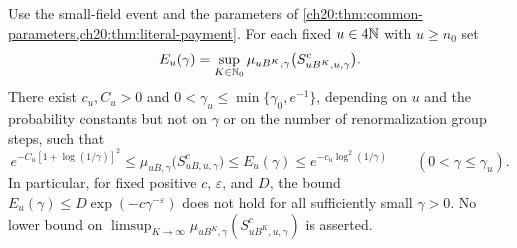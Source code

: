 \begin{theorem}\label{ch20:thm:literal-rejection-log-squared}
Use the small-field event and the parameters of \cref{ch20:thm:common-parameters,ch20:thm:literal-payment}. For each fixed $u\in4\mathbb N$ with $u\ge n_0$ set
\[
 E_u(\gamma)=\sup_{K\in\mathbb N_0}\mu_{uB^K,\gamma}\bigl(S_{uB^K,u,\gamma}^c\bigr).
\]
There exist $c_u,C_u>0$ and $0<\gamma_u\le\min\{\gamma_0,e^{-1}\}$, depending on $u$ and the probability constants but not on $\gamma$ or on the number of renormalization group steps, such that
\begin{equation}\label{ch20:eq:literal-rejection-log-squared}
 e^{-C_u[1+\log(1/\gamma)]^2}\le\mu_{uB,\gamma}\bigl(S_{uB,u,\gamma}^c\bigr)\le E_u(\gamma)\le e^{-c_u\log^2(1/\gamma)}
 \qquad(0<\gamma\le\gamma_u).
\end{equation}
In particular, for fixed positive $c$, $\varepsilon$, and $D$, the bound $E_u(\gamma)\le D\exp(-c\gamma^{-\varepsilon})$ does not hold for all sufficiently small $\gamma>0$. No lower bound on $\limsup_{K\to\infty}\mu_{uB^K,\gamma}(S_{uB^K,u,\gamma}^c)$ is asserted.
\end{theorem}

